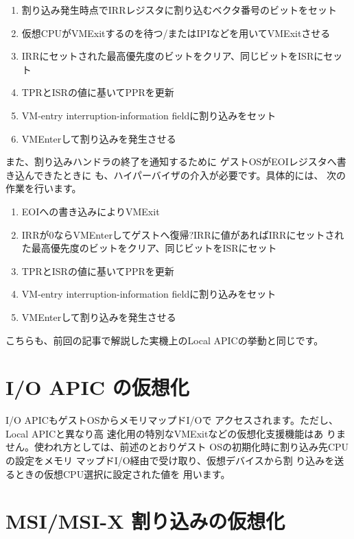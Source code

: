 \begin{enumerate}

\item 割り込み発生時点でIRRレジスタに割り込むベクタ番号のビットをセット
\item 仮想CPUがVMExitするのを待つ/またはIPIなどを用いてVMExitさせる
\item IRRにセットされた最高優先度のビットをクリア、同じビットをISRにセット
\item TPRとISRの値に基いてPPRを更新
\item VM-entry interruption-information fieldに割り込みをセット
\item VMEnterして割り込みを発生させる

\end{enumerate}

 また、割り込みハンドラの終了を通知するために
ゲストOSがEOIレジスタへ書き込んできたときに
も、ハイパーバイザの介入が必要です。具体的には、
次の作業を行います。

\begin{enumerate}

\item EOIへの書き込みによりVMExit
\item IRRが0ならVMEnterしてゲストへ復帰?IRRに値があればIRRにセットされた最高優先度のビットをクリア、同じビットをISRにセット
\item TPRとISRの値に基いてPPRを更新
\item VM-entry interruption-information fieldに割り込みをセット
\item VMEnterして割り込みを発生させる
\end{enumerate}

 こちらも、前回の記事で解説した実機上のLocal
APICの挙動と同じです。


\section{I/O APIC の仮想化}

 I/O APICもゲストOSからメモリマップドI/Oで
アクセスされます。ただし、Local APICと異なり高
速化用の特別なVMExitなどの仮想化支援機能はあ
りません。使われ方としては、前述のとおりゲスト
OSの初期化時に割り込み先CPUの設定をメモリ
マップドI/O経由で受け取り、仮想デバイスから割
り込みを送るときの仮想CPU選択に設定された値を
用います。


\section{MSI/MSI-X 割り込みの仮想化}

